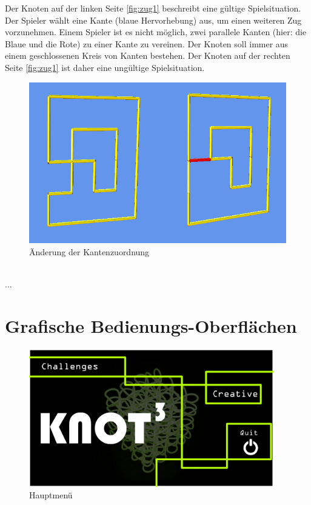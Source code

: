 Der Knoten auf der linken Seite \ref{fig:zug1} beschreibt eine gültige Spielsituation. Der Spieler wählt eine Kante (blaue Hervorhebung) aus, um einen weiteren Zug vorzunehmen.
Einem Spieler ist es nicht möglich, zwei parallele Kanten (hier: die Blaue und die Rote) zu einer Kante zu vereinen. Der Knoten soll immer aus einem geschlossenen Kreis von Kanten bestehen. Der Knoten auf der rechten Seite \ref{fig:zug1} ist daher eine ungültige Spielsituation.

\clearpage

	\begin{figure}[htb]
	  \centering
	  \includegraphics[width = \textwidth]{Systemmodelle/Ungueltiger_Zug2.png}
	  \caption{{\color{red}Änderung der Kantenzuordnung}}
	  \label{fig:zug2}
	\end{figure}
	
~\\
...

\clearpage

\section{Grafische Bedienungs-Oberflächen}

	\begin{figure}[ht]
	  \centering
	  \includegraphics[width = 0.95\textwidth]{Systemmodelle/01_Knot3-mainscreen.png}
	  \caption{Hauptmenü}
	\end{figure}

